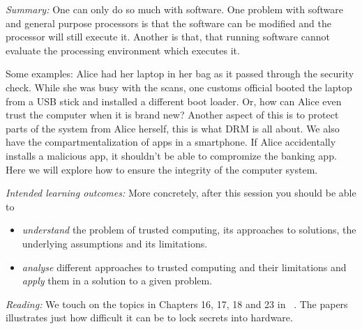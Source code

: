 \emph{Summary:}
One can only do so much with software.
One problem with software and general purpose processors is that the software 
can be modified and the processor will still execute it.
Another is that, that running software cannot evaluate the processing 
environment which executes it.

Some examples: Alice had her laptop in her bag as it passed through the 
security check.
While she was busy with the scans, one customs official booted the laptop from 
a USB stick and installed a different boot loader.
Or, how can Alice even trust the computer when it is brand new?
Another aspect of this is to protect parts of the system from Alice herself, 
\eg this is what \ac{DRM} is all about.
We also have the compartmentalization of apps in a smartphone.
If Alice accidentally installs a malicious app, it shouldn't be able to 
compromize the banking app.
Here we will explore how to ensure the integrity of the computer system.

\emph{Intended learning outcomes:}
More concretely, after this session you should be able to
\begin{itemize}
  \item \emph{understand} the problem of trusted computing, its approaches to 
    solutions, the underlying assumptions and its limitations.
  \item \emph{analyse} different approaches to trusted computing and their 
    limitations and \emph{apply} them in a solution to a given problem.
\end{itemize}

\emph{Reading:}
We touch on the topics in Chapters 16, 17, 18 and 23 in 
~\cite{Anderson2008sea}.
The papers~\cite{%
  VoltageKeyExtraction,AcousticKeyExtraction,ElectromagneticKeyExtraction%
} illustrates just how difficult it can be to lock secrets into hardware.

